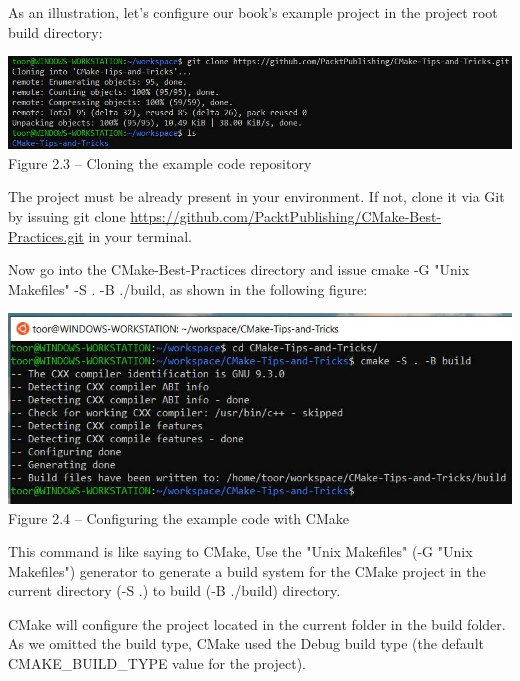 As an illustration, let's configure our book's example project in the project root build directory:

\begin{center}
\includegraphics[width=1.\textwidth]{content/1/chapter2/images/3.jpg}\\
Figure 2.3 – Cloning the example code repository
\end{center}

\begin{tcolorbox}[colback=webgreen!5!white,colframe=webgreen!75!black,title=Important Note]
The project must be already present in your environment. If not, clone it via Git by issuing git clone \url{https://github.com/PacktPublishing/CMake-Best-Practices.git} in your terminal.
\end{tcolorbox}

Now go into the CMake-Best-Practices directory and issue cmake -G "Unix Makefiles" -S . -B ./build, as shown in the following figure:

\begin{center}
\includegraphics[width=1.\textwidth]{content/1/chapter2/images/4.jpg}\\
Figure 2.4 – Configuring the example code with CMake
\end{center}

This command is like saying to CMake, Use the "Unix Makefiles" (-G "Unix Makefiles") generator to generate a build system for the CMake project in the current directory (-S .) to build (-B ./build) directory.

CMake will configure the project located in the current folder in the build folder. As we omitted the build type, CMake used the Debug build type (the default CMAKE\_BUILD\_TYPE value for the project).

